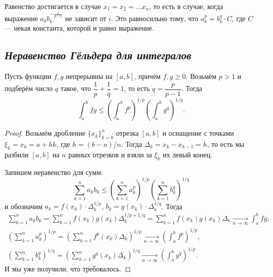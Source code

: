 \begin{remark}
	Равенство достигается в случае \(x_1 = x_2 = \ldots x_n\), то есть в случае, когда выражение \(a_k b_k^{-\frac{1}{p - 1}}\) не зависит от \(i\). Это равносильно тому, что \(a_k^p = b_k^q \cdot C\), где \(C\) --- некая константа, которой и равно выражение. 
\end{remark}

\subsection{\itshape Неравенство Гёльдера для интегралов}

\begin{theorem}
	Пусть функции \(f, g\) непрерывны на  \([a, b]\), причём \(f, g \geqslant 0\). Возьмём \(p > 1\) и подберём число \(q\) такое, что \(\dfrac{1}{p} + \dfrac{1}{q} = 1\), то есть \(q = \dfrac{p}{p - 1}\). Тогда \[
	\int_a^b fg \leqslant \left(\int_{a}^{b} f^p \right)^{1/p} \left(\int_{a}^{b} g^q \right)^{1/q}.
	\]
\end{theorem}
\begin{proof}
	Возьмём дробление \(\{x_k\}_{k=0}^n\) отрезка  \([a, b]\) и оснащение с точками \(\xi_k = x_k = a + hk\), где \(h = (b-a)/n\). Тогда \(\Delta_k = x_{k} - x_{k-1} = h\), то есть мы разбили \([a, b]\) на \(n\) равных отрезков и взяли за \(\xi_k\) их левый конец.
	
	Запишем неравенство для сумм:
	\begin{equation} \label{ГёльГёль}
		\sum_{k=1}^n a_k b_k \leqslant \left(\sum_{k=1}^{n} a_k^p \right)^{1/p} \left(\sum_{k=1}^{n} b_k^q \right)^{1/q}
	\end{equation}
	и обозначим \(a_k = f(x_k) \cdot \Delta_k^{1/p}\), \(b_k = g(x_k) \cdot \Delta_k^{1/q}\). Тогда
	\begin{gather*}
		\sum_{k=1}^n a_k b_k = \sum_{k=1}^n f(x_k) g(x_k) \Delta_k^{1/p + 1/q} = \sum_{k=1}^n f(x_k) g(x_k) \Delta_k \xrightarrow[n \to \infty]{} \int_a^b fg, \\
		\left(\sum_{k=1}^n a_k^p \right)^{1/p} = \left(\sum_{k=1}^n f^p(x_k) \Delta_k \right)^{1/p} \xrightarrow[n \to \infty]{} \left(\int_a^b f^p \right)^{1/p}, \\
		\left(\sum_{k=1}^n b_k^q \right)^{1/q} = \left(\sum_{k=1}^n g^q(x_k) \Delta_k \right)^{1/q} \xrightarrow[n \to \infty]{} \left(\int_a^b g^q\right)^{1/p}.
	\end{gather*}
	И мы уже получили, что требовалось.
\end{proof}

